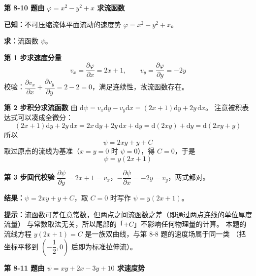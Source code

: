 \noindent\textbf{第 8-10 题\quad 由 $\varphi=x^2-y^2+x$ 求流函数}

\begin{jie}
\textbf{已知：}不可压缩流体平面流动的速度势 $\varphi=x^2-y^2+x$。

\textbf{求：}流函数 $\psi$。

\textbf{第 1 步\quad 求速度分量}
\[ v_x=\frac{\partial\varphi}{\partial x}=2x+1,\qquad v_y=\frac{\partial\varphi}{\partial y}=-2y \]
校验：$\dfrac{\partial v_x}{\partial x}+\dfrac{\partial v_y}{\partial y}=2-2=0$，满足连续性，故流函数存在。

\textbf{第 2 步\quad 积分求流函数}
由 $\mathrm{d}\psi=v_x\mathrm{d}y-v_y\mathrm{d}x=(2x+1)\mathrm{d}y+2y\,\mathrm{d}x$。
注意被积表达式可以凑成全微分：
\[ (2x+1)\mathrm{d}y+2y\,\mathrm{d}x=2x\,\mathrm{d}y+2y\,\mathrm{d}x+\mathrm{d}y
 =\mathrm{d}(2xy)+\mathrm{d}y=\mathrm{d}(2xy+y) \]
所以
\[ \psi=2xy+y+C \]
取过原点的流线为基准（$x=y=0$ 时 $\psi=0$），得 $C=0$，于是
\[ \psi=y\left(2x+1\right) \]

\textbf{第 3 步\quad 回代校验}
$\dfrac{\partial\psi}{\partial y}=2x+1=v_x$，$-\dfrac{\partial\psi}{\partial x}=-2y=v_y$，两式都对。

\textbf{结果：}$\psi=2xy+y+C$，取 $C=0$ 时写作 $\psi=y(2x+1)$。

\textbf{提示：}流函数可差任意常数，但两点之间流函数之差（即通过两点连线的单位厚度流量）
与常数取法无关，所以尾部的「$+C$」不影响任何物理量的计算。
本题的流线方程 $y(2x+1)=C$ 是一族双曲线，与第 8-8 题的速度场属于同一类
（把坐标平移到 $\left(-\dfrac{1}{2},0\right)$ 后即为标准拉伸流）。
\end{jie}

\noindent\textbf{第 8-11 题\quad 由 $\psi=xy+2x-3y+10$ 求速度势}


